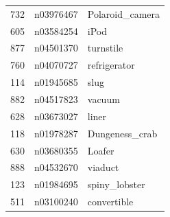 \begin{table}
\begin{tabular}{cll}
732 & n03976467 & Polaroid_camera \\
605 & n03584254 & iPod \\
877 & n04501370 & turnstile \\
760 & n04070727 & refrigerator \\
114 & n01945685 & slug \\
882 & n04517823 & vacuum \\
628 & n03673027 & liner \\
118 & n01978287 & Dungeness_crab \\
630 & n03680355 & Loafer \\
888 & n04532670 & viaduct \\
123 & n01984695 & spiny_lobster \\
511 & n03100240 & convertible \\
\bottomrule
\end{tabular}
\end{table}
